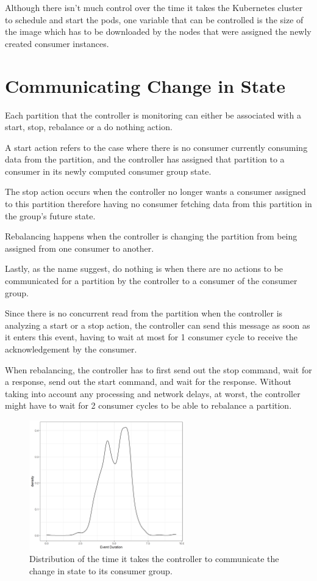 Although there isn't much control over the time it takes the Kubernetes cluster to schedule and start the pods, one variable that can be controlled is the size of the image which has to be downloaded by the nodes that were assigned the newly created consumer instances.

\section{Communicating Change in State}

Each partition that the controller is monitoring can either be associated with a start, stop, rebalance or a do nothing action. 

A start action refers to the case where there is no consumer currently consuming data from the partition, and the controller has assigned that partition to a consumer in its newly computed consumer group state. 

The stop action occurs when the controller no longer wants a consumer assigned to this partition therefore having no consumer fetching data from this partition in the group's future state. 

Rebalancing happens when the controller is changing the partition from being assigned from one consumer to another.

Lastly, as the name suggest, do nothing is when there are no actions to be communicated for a partition by the controller to a consumer of the consumer group.

Since there is no concurrent read from the partition when the controller is analyzing a start or a stop action, the controller can send this message as soon as it enters this event, having to wait at most for 1 consumer cycle to receive the acknowledgement by the consumer. 

When rebalancing, the controller has to first send out the stop command, wait for a response, send out the start command, and wait for the response. Without taking into account any processing and network delays, at worst, the controller might have to wait for 2 consumer cycles to be able to rebalance a partition.

\begin{figure}[H]
    \centering
    \includegraphics[width=0.6\textwidth]{images/integration/delta4.png}
\caption{Distribution of the time it takes the controller to communicate the change in state to its consumer group.}
\label{fig:controller_result_change_state}
\end{figure}

